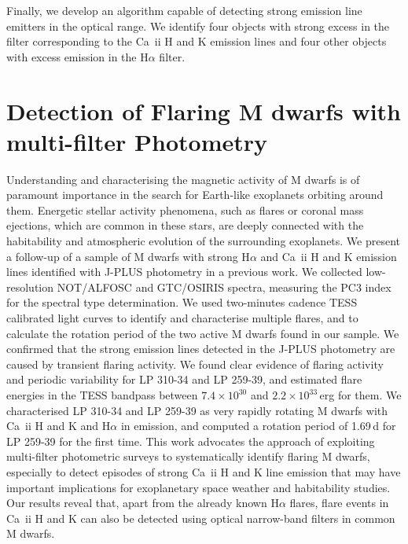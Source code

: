 Finally, we develop an algorithm capable of detecting strong emission line emitters in the optical range. We identify four objects with strong excess in the filter corresponding to the Ca~{\sc ii} H and K emission lines and four other objects with excess emission in the H$\alpha$ filter.

\chapter{Detection of Flaring M dwarfs with multi-filter Photometry}
\label{chp:flares_paper}







Understanding and characterising the magnetic activity of M dwarfs is of paramount importance in the search for Earth-like exoplanets orbiting around them. Energetic stellar activity phenomena, such as flares or coronal mass ejections, which are common in these stars, are deeply connected with the habitability and atmospheric evolution of the surrounding exoplanets. We present a follow-up of a sample of M dwarfs with strong H$\alpha$ and Ca~{\sc ii} H and K emission lines identified with J-PLUS photometry in a previous work. We collected low-resolution NOT/ALFOSC and GTC/OSIRIS spectra, measuring the PC3 index for the spectral type determination. We used two-minutes cadence TESS calibrated light curves to identify and characterise multiple flares, and to calculate the rotation period of the two active M dwarfs found in our sample. We confirmed that the strong emission lines detected in the J-PLUS photometry are caused by transient flaring activity. We found clear evidence of flaring activity and periodic variability for LP 310-34 and LP 259-39, and estimated flare energies in the TESS bandpass between $7.4\times10^{30}$ and $2.2\times10^{33}$\,erg for them. We characterised LP 310-34 and LP 259-39 as very rapidly rotating M dwarfs with Ca~{\sc ii} H and K and H$\alpha$ in emission, and computed a rotation period of 1.69\,d for LP 259-39 for the first time. This work advocates the approach of exploiting multi-filter photometric surveys to systematically identify flaring M dwarfs, especially to detect episodes of strong Ca~{\sc ii} H and K line emission that may have important implications for exoplanetary space weather and habitability studies. Our results reveal that, apart from the already known H$\alpha$ flares, flare events in Ca~{\sc ii} H and K can also be detected using optical narrow-band filters in common M dwarfs.


